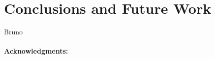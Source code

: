 \documentclass{llncs}
\begin{document}









\section{Conclusions and Future Work}

Bruno


\vspace{-10pt}
\paragraph{Acknowledgments:}





\end{document}
